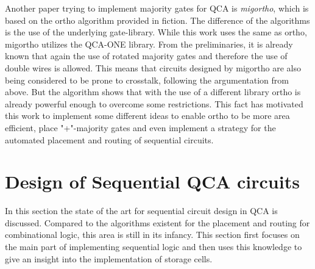 Another paper trying to implement majority gates for QCA is \textit{migortho}, which is based on the ortho algorithm provided in fiction. The difference of the algorithms is the use of the underlying gate-library. While this work uses the same as ortho, migortho utilizes the QCA-ONE library. From the preliminaries, it is already known that again the use of rotated majority gates and therefore the use of double wires is allowed. This means that circuits designed by migortho are also being considered to be prone to crosstalk, following the argumentation from above. But the algorithm shows that with the use of a different library ortho is already powerful enough to overcome some restrictions. This fact has motivated this work to implement some different ideas to enable ortho to be more area efficient, place "+"-majority gates and even implement a strategy for the automated placement and routing of sequential circuits.

\section{Design of Sequential QCA circuits}
In this section the state of the art for sequential circuit design in QCA is discussed. Compared to the algorithms existent for the placement and routing for combinational logic, this area is still in its infancy. This section first focuses on the main part of implementing sequential logic and then uses this knowledge to give an insight into the implementation of storage cells. 

